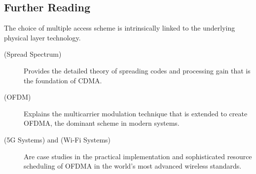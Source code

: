 \begin{importantbox}
\section*{Further Reading}
The choice of multiple access scheme is intrinsically linked to the underlying physical layer technology.
\begin{description}
    \item[ (Spread Spectrum)] Provides the detailed theory of spreading codes and processing gain that is the foundation of CDMA.
    \item[ (OFDM)] Explains the multicarrier modulation technique that is extended to create OFDMA, the dominant scheme in modern systems.
    \item[ (5G Systems) and  (Wi-Fi Systems)] Are case studies in the practical implementation and sophisticated resource scheduling of OFDMA in the world's most advanced wireless standards.
\end{description}
\end{importantbox}

